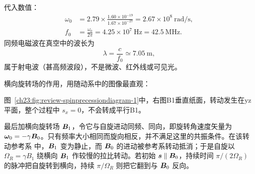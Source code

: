 {\begin{xesolution}
代入数值：
\begin{align}
  \omega_0&=2.79\times\frac{1.60\times10^{-19}}{1.67\times10^{-27}}
  =2.67\times10^8\ \mathrm{rad/s},\\
  f_0&=\frac{\omega_0}{2\pi}=\boxed{4.25\times10^7\ \mathrm{Hz}}
  =\boxed{42.5\ \mathrm{MHz}}.
\end{align}
同频电磁波在真空中的波长为
\begin{equation}
  \boxed{\lambda=\frac{c}{f_0}\simeq7.05\ \mathrm m},
\end{equation}
属于射电波（甚高频波段），不是微波、红外线或可见光。

横向旋转场的作用，用随动系中的图像最直观：

图~\ref{ch23:fig:review-spinprecessiondiagram-1}中，右图B1垂直纸面，转动发生在yz平面，整个过程中 $s_x=0$，不会转成平行B1。
\par\noindent\begin{minipage}{\linewidth}
\spinPrecessionDiagram
{}
\end{minipage}\par\medskip

最后加横向旋转场 $\bm{B}_1$，令它与自旋进动同频、同向，即旋转角速度矢量为
$\bm{\omega}_0=-\gamma\bm{B}_0$。只有频率大小相同而旋向相反，并不满足这里的共振条件。在该转动参考系
中，$\bm{B}_1$ 变为静止，而 $\bm{B}_0$ 的进动被参考系转动抵消；于是自旋以
$\boxed{\Omega_R=\gamma B_1}$ 绕横向 $\bm{B}_1$ 作较慢的拉比转动。若初始
$\bm{s}\parallel\bm{B}_0$，持续时间
$\pi/(2\Omega_R)$ 的脉冲把自旋转到横向，持续 $\pi/\Omega_R$ 则把它翻到与 $\bm{B}_0$ 反向。

\end{xesolution}
}

\endgroup
